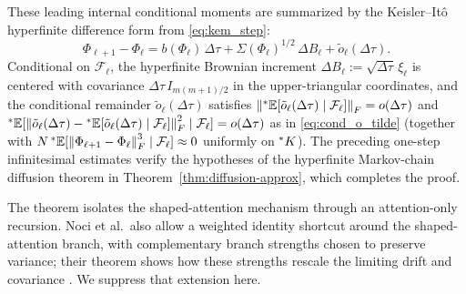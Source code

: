 \begin{proofsketch}
These leading internal conditional moments are summarized by the Keisler--It\^o hyperfinite difference form from \eqref{eq:kem_step}:
\begin{equation}
\label{eq:ch6-keisler-ito-attn}
\Phi_{\ell+1} - \Phi_\ell = b(\Phi_\ell)\,\Delta\tau + \Sigma(\Phi_\ell)^{1/2}\,\Delta B_\ell + \tilde{o}_\ell(\Delta\tau).
\end{equation}
Conditional on $\mathcal{F}_\ell$, the hyperfinite Brownian increment $\Delta B_\ell := \sqrt{\Delta\tau}\,\xi_\ell$ is centered with covariance $\Delta\tau\,I_{m(m+1)/2}$ in the upper-triangular coordinates, and the conditional remainder $\tilde{o}_\ell(\Delta\tau)$ satisfies $\left\lVert {}^*\mathbb{E}[\tilde{o}_\ell(\Delta\tau)\mid\mathcal{F}_\ell] \right\rVert_F = o(\Delta\tau)$ and ${}^*\mathbb{E}[\left\lVert \tilde{o}_\ell(\Delta\tau) - {}^*\mathbb{E}[\tilde{o}_\ell(\Delta\tau)\mid\mathcal{F}_\ell] \right\rVert_F^2 \mid \mathcal{F}_\ell] = o(\Delta\tau)$ as in \eqref{eq:cond_o_tilde}
(together with $N\,{}^*\mathbb{E}[\left\lVert \Phi_{\ell+1}-\Phi_\ell \right\rVert_F^3 \mid \mathcal{F}_\ell] \approx 0$ uniformly on ${}^*K$). The preceding one-step infinitesimal estimates verify the hypotheses of the hyperfinite Markov-chain diffusion theorem in Theorem~\ref{thm:diffusion-approx}, which completes the proof.
\end{proofsketch}

\begin{remark}
\label{rem:shaped-attn-shortcuts}
The theorem isolates the shaped-attention mechanism through an attention-only recursion. Noci et al.\ also allow a weighted identity shortcut around the shaped-attention branch, with complementary branch strengths chosen to preserve variance; their theorem shows how these strengths rescale the limiting drift and covariance \cite[Theorem 4.2]{noci2023shaped}. We suppress that extension here.
\end{remark}

